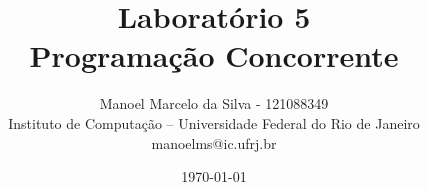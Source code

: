 \documentclass[answers]{exam}
\title{{Laboratório 5}
	\\
{Programação Concorrente}}
\author{Manoel Marcelo da Silva - 121088349\\
Instituto de Computação -- Universidade Federal do Rio de Janeiro\\
manoelms@ic.ufrj.br}
\date{\today}
\begin{document}
\maketitle

\begin{questions}
    
    
    
    \newpage
    
    

\end{questions}

% 
% 
\end{document}
